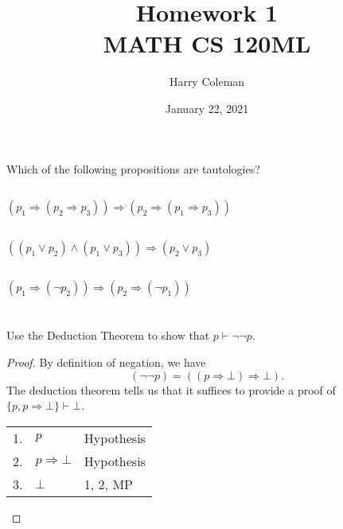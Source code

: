 \documentclass[12pt]{article}
\title{Homework 1\\
    \large MATH CS 120ML
}
\author{Harry Coleman}
\date{January 22, 2021}
\newenvironment{problem}
    {\begin{lrbox}{\mybox}\begin{minipage}{0.98\textwidth}}
    {\end{minipage}\end{lrbox}\begin{center}\framebox[\textwidth]{\usebox{\mybox}}\end{center}}
\renewcommand{\implies}{\Rightarrow}
\newcommand{\proves}{\vdash}
\begin{document}
\maketitle

\section{}
\begin{problem}
    Which of the following propositions are tautologies?
\end{problem}

\subsection{}
\begin{problem}
    $(p_1 \implies (p_2 \implies p_3)) \implies (p_2 \implies (p_1 \implies p_3))$
\end{problem}

\subsection{}
\begin{problem}
    $((p_1 \lor p_2) \land (p_1 \lor p_3)) \implies (p_2 \lor p_3)$
\end{problem}

\subsection{}
\begin{problem}
    $(p_1 \implies (\lnot p_2)) \implies (p_2 \implies (\lnot p_1))$
\end{problem}

\newpage
\section{}
\begin{problem}
    Use the Deduction Theorem to show that $p \proves \lnot \lnot p$.
\end{problem}

\begin{proof}
    By definition of negation, we have
    \[
        (\lnot \lnot p) = ((p \implies \bot) \implies \bot).
    \]
    The deduction theorem tells us that it suffices to provide a proof of $\{p, p \implies \bot\} \proves \bot$. 
    \begin{center}
        \begin{tabular}{r l l}
            1. & $p$ & Hypothesis \\
            2. & $p \implies \bot$ & Hypothesis \\
            3. & $\bot$ & 1, 2, MP
        \end{tabular}
    \end{center}
    
\end{proof}
\end{document}
